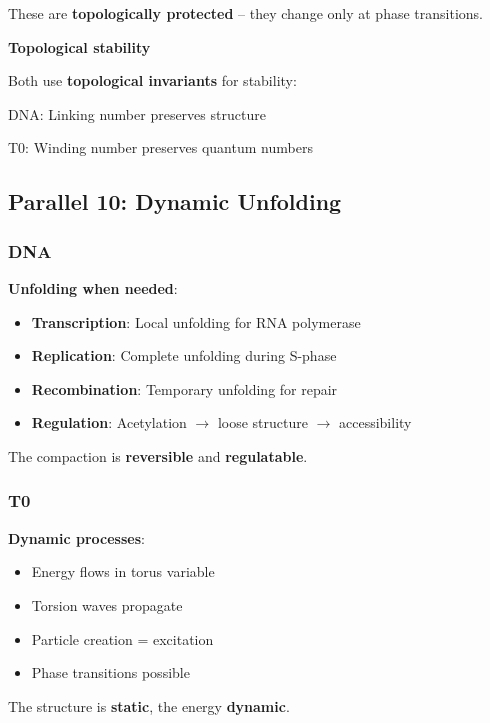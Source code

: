 	These are \textbf{topologically protected} -- they change only at phase transitions.

	\begin{keyresult}
		\textbf{Topological stability}

		Both use \textbf{topological invariants} for stability:

		DNA: Linking number preserves structure

		T0: Winding number preserves quantum numbers
	\end{keyresult}

	\subsection{Parallel 10: Dynamic Unfolding}

	\subsubsection{DNA}

	\textbf{Unfolding when needed}:

	\begin{itemize}
		\item \textbf{Transcription}: Local unfolding for RNA polymerase
		\item \textbf{Replication}: Complete unfolding during S-phase
		\item \textbf{Recombination}: Temporary unfolding for repair
		\item \textbf{Regulation}: Acetylation $\to$ loose structure $\to$ accessibility
	\end{itemize}

	The compaction is \textbf{reversible} and \textbf{regulatable}.

	\subsubsection{T0}

	\textbf{Dynamic processes}:
	\begin{itemize}
		\item Energy flows in torus variable
		\item Torsion waves propagate
		\item Particle creation = excitation
		\item Phase transitions possible
	\end{itemize}

	The structure is \textbf{static}, the energy \textbf{dynamic}.

